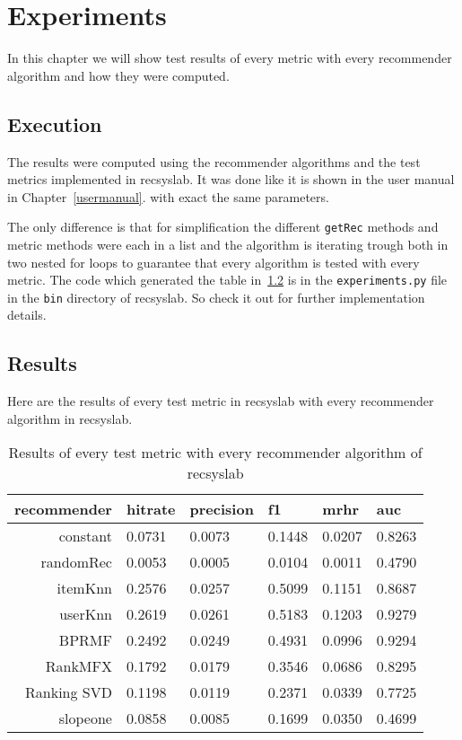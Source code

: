 \chapter{Experiments}
\label{experiments}
In this chapter we will show test results of every metric with every
recommender algorithm and how they were computed.


\section{Execution}
The results were computed using the recommender algorithms and 
the test metrics implemented in recsyslab. It was done 
like it is shown in the user manual in Chapter~\ref{usermanual}.
with exact the same parameters.

The only difference is that for simplification the different
\lstinline!getRec! methods and metric methods were each in a list and the 
algorithm is iterating trough both in two nested for loops
to guarantee that every algorithm is tested with every metric.
The code which generated the table in~\ref{results} is in 
the \lstinline!experiments.py! file in the \lstinline!bin! directory of recsyslab.
So check it out for further implementation details.


\section{Results}
\label{results}
Here are the results of every test metric in recsyslab
with every recommender algorithm in recsyslab.

\begin{table}[h]
\begin{tabular}{rlllll}
    recommender  & hitrate & precision & f1 & mrhr & auc \\ \midrule
    constant & 0.0731 & 0.0073 & 0.1448 & 0.0207 & 0.8263 \\
    randomRec & 0.0053 & 0.0005 & 0.0104 & 0.0011 & 0.4790 \\
    itemKnn & 0.2576 & 0.0257 & 0.5099 & 0.1151 & 0.8687 \\
    userKnn & 0.2619 & 0.0261 & 0.5183 & 0.1203 & 0.9279 \\
    BPRMF& 0.2492 & 0.0249 & 0.4931 & 0.0996 & 0.9294 \\
    RankMFX & 0.1792 & 0.0179 & 0.3546 & 0.0686 & 0.8295 \\
    Ranking SVD & 0.1198 & 0.0119 & 0.2371 & 0.0339 & 0.7725 \\
    slopeone & 0.0858 & 0.0085 & 0.1699 & 0.0350 & 0.4699 \\ \bottomrule
\end{tabular}
\caption{Results of every test metric with every recommender algorithm of recsyslab}
\end{table}
\newpage

